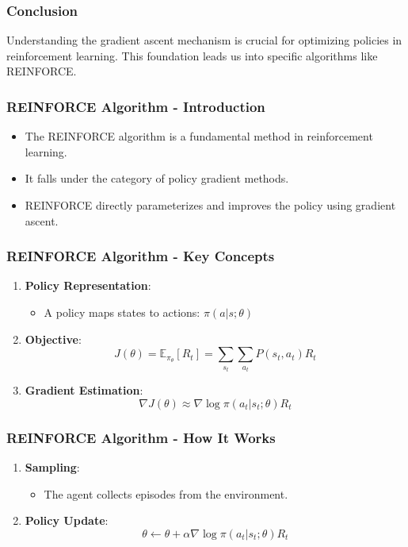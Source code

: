 \documentclass[aspectratio=169]{beamer}
\begin{document}
\begin{frame}[fragile]
    \frametitle{Conclusion}
    Understanding the gradient ascent mechanism is crucial for optimizing policies in reinforcement learning. This foundation leads us into specific algorithms like REINFORCE.
\end{frame}

\begin{frame}[fragile]
  \frametitle{REINFORCE Algorithm - Introduction}
  \begin{itemize}
    \item The REINFORCE algorithm is a fundamental method in reinforcement learning.
    \item It falls under the category of policy gradient methods.
    \item REINFORCE directly parameterizes and improves the policy using gradient ascent.
  \end{itemize}
\end{frame}

\begin{frame}[fragile]
  \frametitle{REINFORCE Algorithm - Key Concepts}
  \begin{enumerate}
    \item \textbf{Policy Representation}:
      \begin{itemize}
        \item A policy maps states to actions: \( \pi(a|s; \theta) \)
      \end{itemize}
    \item \textbf{Objective}:
      \begin{equation}
      J(\theta) = \mathbb{E}_{\pi_\theta} \left[ R_t \right] = \sum_{s_t} \sum_{a_t} P(s_t, a_t) R_t
      \end{equation}
    \item \textbf{Gradient Estimation}:
      \begin{equation}
      \nabla J(\theta) \approx \nabla \log \pi(a_t|s_t; \theta) R_t
      \end{equation}
  \end{enumerate}
\end{frame}

\begin{frame}[fragile]
  \frametitle{REINFORCE Algorithm - How It Works}
  \begin{enumerate}
    \item \textbf{Sampling}:
      \begin{itemize}
        \item The agent collects episodes from the environment.
      \end{itemize}
    \item \textbf{Policy Update}:
      \begin{equation}
      \theta \leftarrow \theta + \alpha \nabla \log \pi(a_t|s_t; \theta) R_t
      \end{equation}
  \end{enumerate}
\end{frame}
\end{document}
